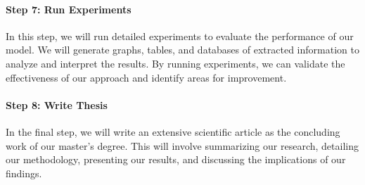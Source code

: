 \documentclass[a4paper,11pt]{article}
\begin{document}
\paragraph{Step 7: Run Experiments}
In this step, we will run detailed experiments to evaluate the performance of
our model. We will generate graphs, tables, and databases of extracted
information to analyze and interpret the results. By running experiments, we
can validate the effectiveness of our approach and identify areas for
improvement.


\paragraph{Step 8: Write Thesis}
In the final step, we will write an extensive scientific article as the
concluding work of our master's degree. This will involve summarizing our
research, detailing our methodology, presenting our results, and discussing the
implications of our findings.



\end{document}
